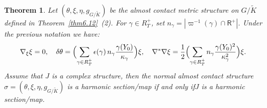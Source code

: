 \documentclass[a4paper,reqno]{amsart}
\newtheorem{thm}{Theorem}[section]
\theoremstyle{definition}
\theoremstyle{remark}
\theoremstyle{plain}
\numberwithin{equation}{section}
\newcommand{\proots}{\mathsf{R}^+}
\newcommand{\Kt}{{\widetilde{K}}}
\newcommand{\wK}{{\widetilde{K}}}
\newcommand{\half}{{\frac{1}{2}}}
\newcommand{\sissi}{if and only if\xspace}
\newcommand{\NACS}{normal almost contact structure\xspace}
\newcommand{\ACMS}{almost contact metric
  structure\xspace}
\newcommand{\txeMK}{{(\theta,\xi,\eta,g_{\scriptscriptstyle{G/\wK}})}}
\begin{document}
\begin{thm}
  \label{prop6.16}
  Let $\txeMK$ be the \ACMS on $G/\Kt$ defined in
  Theorem~\ref{thm6.12}~(2). For $\gamma \in R_T^+$, set
  $n_\gamma= |\varpi^{-1}(\gamma) \cap \proots|$. 
   Under the previous notation we have:
  \begin{equation*}
\nabla_\xi \xi = 0, \quad    \delta \theta   = \Bigl(\sum_{\gamma \in R_T^+}
   \epsilon(\gamma) \, n_\gamma  \frac{\gamma(Y_0)}{\kappa_\gamma}\Bigl) \xi,
\quad
 \nabla^*\nabla  \xi   = \half\Bigl(\sum_{\gamma \in R_T^+}
 n_\gamma   \frac{\gamma(Y_0)^2}{\kappa_\gamma^2}\Bigr) \xi.
\end{equation*}
Assume that $J$ is a complex structure, then the \NACS  $\sigma=\txeMK$ is a harmonic section/map \sissi $J$ is a
  harmonic section/map.
 \end{thm}
\end{document}
